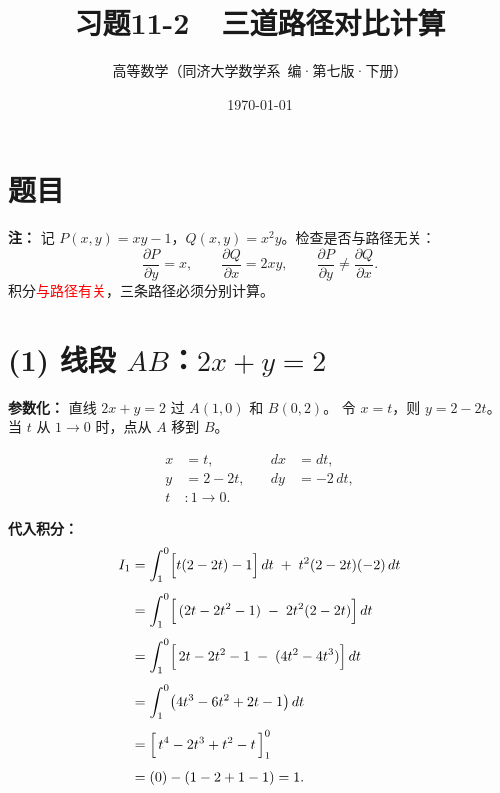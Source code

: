 \documentclass[12pt,a4paper]{ctexart}
\begin{document}
\title{\Huge\bfseries 习题11-2~~三道路径对比计算}
\author{高等数学（同济大学数学系~编·第七版·下册）}
\date{\today}
\maketitle
\thispagestyle{fancy}

\section*{题目}

\bigskip

\textbf{注：} 记 $P(x,y)=xy-1$，$Q(x,y)=x^2y$。检查是否与路径无关：
\[
\frac{\partial P}{\partial y} = x,\qquad
\frac{\partial Q}{\partial x} = 2xy,\qquad
\frac{\partial P}{\partial y} \neq \frac{\partial Q}{\partial x}.
\]
积分\textcolor{red}{与路径有关}，三条路径必须分别计算。

\section*{(1) 线段 $AB$：$2x + y = 2$}

\medskip

\noindent\textbf{参数化：}
直线 $2x+y=2$ 过 $A(1,0)$ 和 $B(0,2)$。
令 $x = t$，则 $y = 2-2t$。当 $t$ 从 $1 \to 0$ 时，点从 $A$ 移到 $B$。

\[
\begin{aligned}
x &= t,      &\quad dx &= dt,\\
y &= 2-2t,   &\quad dy &= -2\,dt,\\
t &: 1 \to 0.
\end{aligned}
\]

\noindent\textbf{代入积分：}
\[
\begin{aligned}
I_1 &= \int_1^0 \Bigl[t(2-2t)-1\Bigr]\,dt \;+\; t^2(2-2t)(-2)\,dt \\[4pt]
    &= \int_1^0 \Bigl[\,(2t-2t^2-1) \;-\; 2t^2(2-2t)\Bigr]\,dt \\[4pt]
    &= \int_1^0 \Bigl[\,2t-2t^2-1 \;-\; (4t^2-4t^3)\Bigr]\,dt \\[4pt]
    &= \int_1^0 \bigl(4t^3 - 6t^2 + 2t - 1\bigr)\,dt \\[4pt]
    &= \Bigl[\,t^4 - 2t^3 + t^2 - t\,\Bigr]_1^0 \\[4pt]
    &= (0) - (1-2+1-1) = 1.
\end{aligned}
\]
\end{document}
